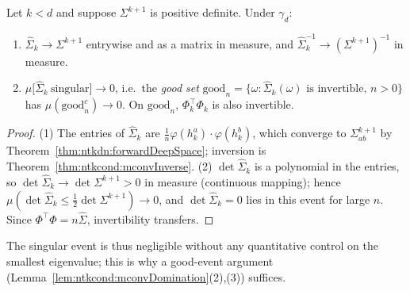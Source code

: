\begin{lemma}\label{lem:ntkdn:singular}
  \leanok
Let $k<d$ and suppose $\Sigma^{k+1}$ is positive definite. Under $\gamma_d$:
\begin{enumerate}
  \item $\hat\Sigma_k\to\Sigma^{k+1}$ entrywise and as a matrix in measure, and $\hat\Sigma_k^{-1}\to(\Sigma^{k+1})^{-1}$ in measure.
  \item $\mu\bigl[\hat\Sigma_k\ \text{singular}\bigr]\to0$, i.e.\ the \emph{good set} $\mathrm{good}_n=\{\omega:\hat\Sigma_k(\omega)\text{ is invertible},\,n>0\}$ has $\mu(\mathrm{good}_n^c)\to0$. On $\mathrm{good}_n$, $\Phi_k^\top\Phi_k$ is also invertible.
\end{enumerate}
\end{lemma}

\begin{proof}
  \leanok
(1) The entries of $\hat\Sigma_k$ are $\frac1n\varphi(h_k^a)\cdot\varphi(h_k^b)$, which converge to $\Sigma^{k+1}_{ab}$ by Theorem~\ref{thm:ntkdn:forwardDeepSpace}; inversion is Theorem~\ref{thm:ntkcond:mconvInverse}. (2) $\det\hat\Sigma_k$ is a polynomial in the entries, so $\det\hat\Sigma_k\to\det\Sigma^{k+1}>0$ in measure (continuous mapping); hence $\mu(\det\hat\Sigma_k\le\tfrac12\det\Sigma^{k+1})\to0$, and $\det\hat\Sigma_k=0$ lies in this event for large $n$. Since $\Phi^\top\Phi=n\hat\Sigma$, invertibility transfers.
\end{proof}

The singular event is thus negligible without any quantitative control on the smallest eigenvalue; this is why a good-event argument (Lemma~\ref{lem:ntkcond:mconvDomination}(2),(3)) suffices.

